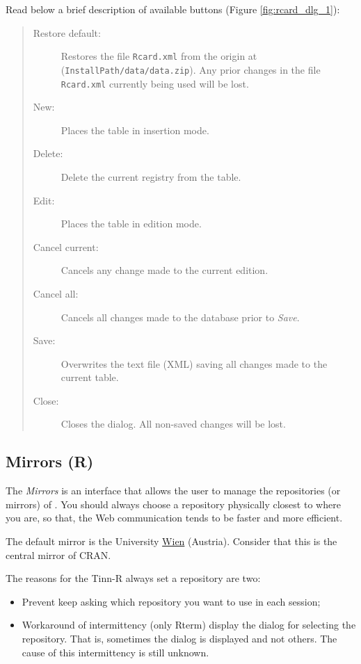 Read below a brief description of available buttons (Figure \ref{fig:rcard_dlg_1}):

\begin{quote}
  \begin{footnotesize}
    \begin{description}
      \item[Restore default:]
        Restores the file \texttt{Rcard.xml} from the origin at
        (\texttt{InstallPath/data/data.zip}). Any prior changes in the
        file \texttt{Rcard.xml} currently being used will be lost.
      \item[New:]
        Places the table in insertion mode.
      \item[Delete:]
        Delete the current registry from the table.
      \item[Edit:]
        Places the table in edition mode.
      \item[Cancel current:]
        Cancels any change made to the current edition.
      \item[Cancel all:]
        Cancels all changes made to the database prior to \textit{Save}.
      \item[Save:]
        Overwrites the text file (XML) saving all changes made to the current table.
      \item[Close:]
        Closes the dialog. All non-saved changes will be lost.
    \end{description}
  \end{footnotesize}
\end{quote}


\subsection{Mirrors (R)}

The \textit{Mirrors} is an interface that allows the user to manage the repositories (or mirrors) of \RR{}.
You should always choose a repository physically closest to where you are,
so that, the Web communication tends to be faster and more efficient.

The default mirror is the University \href{http://cran.at.r-project.org/}{Wien}
(Austria). Consider that this is the central mirror of CRAN.

The reasons for the Tinn-R always set a repository are two:
\begin {itemize}
   \item Prevent \RR{} keep asking which repository you want to use in each session;
   \item Workaround of intermittency (only Rterm) display the dialog for selecting the repository.
    That is, sometimes the dialog is displayed and not others. The cause of this intermittency is still unknown.
\end {itemize}

